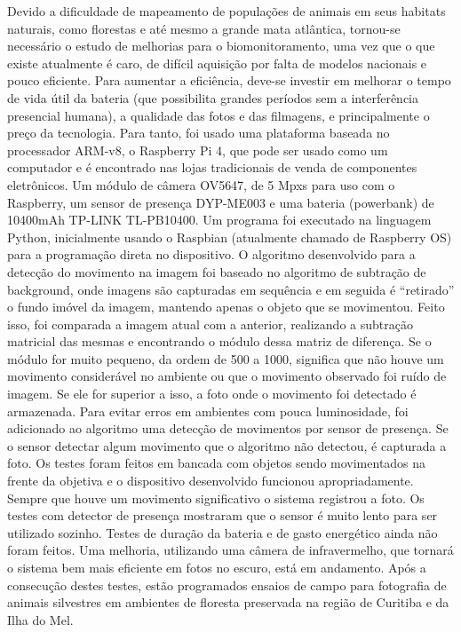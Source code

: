 Devido a dificuldade de mapeamento de populações de animais em seus habitats naturais, como
florestas e até mesmo a grande mata atlântica, tornou-se necessário o estudo de melhorias para o
biomonitoramento, uma vez que o que existe atualmente é caro, de difícil aquisição por falta de
modelos nacionais e pouco eficiente. Para aumentar a eficiência, deve-se investir em melhorar o
tempo de vida útil da bateria (que possibilita grandes períodos sem a interferência presencial
humana), a qualidade das fotos e das filmagens, e principalmente o preço da tecnologia.
Para tanto, foi usado uma plataforma baseada no processador ARM-v8, o Raspberry Pi 4, que
pode ser usado como um computador e é encontrado nas lojas tradicionais de venda de
componentes eletrônicos. Um módulo de câmera OV5647, de 5 Mpxs para uso com o Raspberry,
um sensor de presença DYP-ME003 e uma bateria (powerbank) de 10400mAh TP-LINK
TL-PB10400. Um programa foi executado na linguagem Python, inicialmente usando o
Raspbian (atualmente chamado de Raspberry OS) para a programação direta no dispositivo.
O algoritmo desenvolvido para a detecção do movimento na imagem foi baseado no algoritmo
de subtração de background, onde imagens são capturadas em sequência e em seguida é
“retirado” o fundo imóvel da imagem, mantendo apenas o objeto que se movimentou. Feito isso,
foi comparada a imagem atual com a anterior, realizando a subtração matricial das mesmas e
encontrando o módulo dessa matriz de diferença. Se o módulo for muito pequeno, da ordem de
500 a 1000, significa que não houve um movimento considerável no ambiente ou que o
movimento observado foi ruído de imagem. Se ele for superior a isso, a foto onde o movimento
foi detectado é armazenada. Para evitar erros em ambientes com pouca luminosidade, foi
adicionado ao algoritmo uma detecção de movimentos por sensor de presença. Se o sensor
detectar algum movimento que o algoritmo não detectou, é capturada a foto.
Os testes foram feitos em bancada com objetos sendo movimentados na frente da objetiva e o
dispositivo desenvolvido funcionou apropriadamente. Sempre que houve um movimento
significativo o sistema registrou a foto. Os testes com detector de presença mostraram que o
sensor é muito lento para ser utilizado sozinho. Testes de duração da bateria e de gasto
energético ainda não foram feitos. Uma melhoria, utilizando uma câmera de infravermelho, que
tornará o sistema bem mais eficiente em fotos no escuro, está em andamento. Após a consecução
destes testes, estão programados ensaios de campo para fotografia de animais silvestres em
ambientes de floresta preservada na região de Curitiba e da Ilha do Mel.
